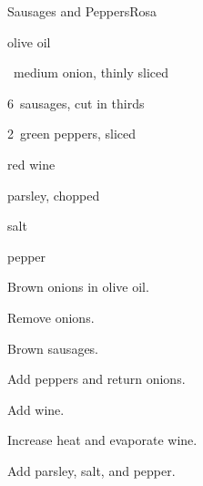 \begin{recipe}{Sausages and Peppers}{Rosa}{}

\begin{ingredients}
\item {} olive oil
\item \half~medium onion, thinly sliced
\item 6~sausages, cut in thirds
\item 2~green peppers, sliced
\item \C{\half} red wine
\item parsley, chopped
\item salt
\item pepper
\end{ingredients}

\begin{directions}
\item Brown onions in olive oil.
\item Remove onions.
\item Brown sausages.
\item Add peppers and return onions.
\item Add wine.
\item Increase heat and evaporate wine.
\item Add parsley, salt, and pepper.
\end{directions}

\end{recipe}
